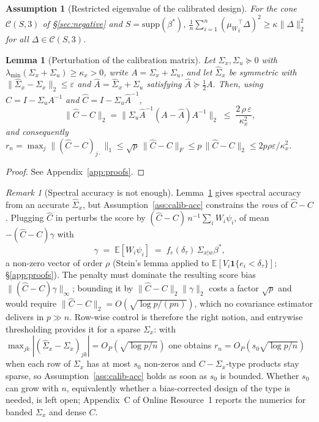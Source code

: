 \documentclass[12pt,a4paper]{article}
\newtheorem{lemma}[theorem]{Lemma}
\newtheorem{assumption}{Assumption}[section]
\theoremstyle{definition}
\theoremstyle{remark}
\newtheorem{remark}[theorem]{Remark}
\newcommand{\E}{\mathbb{E}}
\newcommand{\cC}{\mathcal{C}}
\newcommand{\ind}[1]{\mathbf{1}\{#1\}}
\newcommand{\supp}{\mathrm{supp}}
\newcommand{\betas}{\beta^*}
\newcommand{\muv}{\mu_W}
\newcommand{\Sxw}{\Sigma_{x|w}}
\newcommand{\Ccal}{C}
\begin{document}
\begin{assumption}[Restricted eigenvalue of the calibrated design]
\label{ass:re-est}
For the cone $\cC(S,3)$ of \S\ref{sec:negative} and $S=\supp(\betas)$,
$\frac1n\sum_{i=1}^n({\muv}_i^\top\Delta)^2 \ge \kappa\|\Delta\|_2^2$ for all
$\Delta\in\cC(S,3)$.
\end{assumption}

\begin{lemma}[Perturbation of the calibration matrix]
\label{lem:perturb}
Let $\Sigma_x,\Sigma_u\succeq0$ with $\lambda_{\min}(\Sigma_x+\Sigma_u)\ge\kappa_x>0$, write
$A=\Sigma_x+\Sigma_u$, and let $\hat\Sigma_x$ be symmetric with
$\|\hat\Sigma_x-\Sigma_x\|_2\le\varepsilon$ and $\hat A=\hat\Sigma_x+\Sigma_u$ satisfying
$\hat A\succeq\frac12A$. Then, using $\Ccal=I-\Sigma_uA^{-1}$ and
$\hat\Ccal=I-\Sigma_u\hat A^{-1}$,
\begin{equation}
\big\|\hat\Ccal-\Ccal\big\|_2
= \big\|\Sigma_u\hat A^{-1}(A-\hat A)A^{-1}\big\|_2
\;\le\; \frac{2\,\rho\,\varepsilon}{\kappa_x^{2}} ,
\label{eq:perturb}
\end{equation}
and consequently $r_n = \max_j\|(\hat\Ccal-\Ccal)_{j\cdot}\|_1 \le \sqrt p\,\|\hat\Ccal-\Ccal\|_F
\le p\,\|\hat\Ccal-\Ccal\|_2 \le 2p\rho\varepsilon/\kappa_x^2$.
\end{lemma}

\begin{proof}
See Appendix~\ref{app:proofs}.
\end{proof}

\begin{remark}[Spectral accuracy is not enough]
\label{rem:spectral-not-enough}
Lemma~\ref{lem:perturb} gives spectral accuracy from an accurate $\hat\Sigma_x$, but
Assumption~\ref{ass:calib-acc} constrains the \emph{rows} of $\hat\Ccal-\Ccal$. Plugging
$\hat\Ccal$ in perturbs the
score by $(\hat\Ccal-\Ccal)\,n^{-1}\sum_iW_i\psi_i$, of mean
$-(\hat\Ccal-\Ccal)\gamma$ with
\begin{equation}
\gamma \;=\; \E[W_i\psi_i] \;=\; f_e(\delta_\tau)\,\Sxw\betas ,
\label{eq:gamma}
\end{equation}
a non-zero vector of order $\rho$ (Stein's lemma applied to
$\E[V_i\ind{e_i<\delta_\tau}]$; \S\ref{app:proofs}). The penalty must dominate the
resulting score bias
$\|(\hat\Ccal-\Ccal)\gamma\|_\infty$; bounding it by
$\|\hat\Ccal-\Ccal\|_2\|\gamma\|_2$ costs a factor $\sqrt p$ and would
require $\|\hat\Ccal-\Ccal\|_2 = O(\sqrt{\log p/(pn)})$, which no covariance estimator
delivers in $p\gg n$. Row-wise control is therefore
the right notion, and entrywise thresholding provides it for a sparse $\Sigma_x$: with
$\max_{jk}|(\hat\Sigma_x-\Sigma_x)_{jk}|=O_P(\sqrt{\log p/n})$
one obtains $r_n=O_P(s_0\sqrt{\log p/n})$ when each row of $\Sigma_x$ has at most $s_0$
non-zeros and $\Ccal-\Sigma_x$-type products stay sparse, so
Assumption~\ref{ass:calib-acc} holds as soon as $s_0$ is bounded. Whether $s_0$ can grow
with $n$, equivalently whether a bias-corrected design of the
\citet{loh2012highdim} type is needed, is left open; Appendix~C of Online Resource~1 reports the numerics for
banded $\Sigma_x$ and dense $\Ccal$.
\end{remark}
\end{document}
